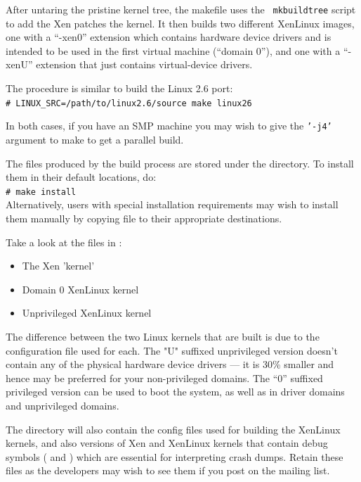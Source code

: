 \documentclass[11pt,twoside,final,openright]{xenstyle}
\begin{document}
After untaring the pristine kernel tree, the makefile uses the {\tt
mkbuildtree} script to add the Xen patches the kernel. It then builds
two different XenLinux images, one with a ``-xen0'' extension which
contains hardware device drivers and is intended to be used in the
first virtual machine (``domain 0''), and one with a ``-xenU''
extension that just contains virtual-device drivers.

The procedure is similar to build the Linux 2.6 port: \\
\verb!# LINUX_SRC=/path/to/linux2.6/source make linux26!

In both cases, if you have an SMP machine you may wish to give the
{\tt '-j4'} argument to make to get a parallel build.

The files produced by the build process are stored under the
 directory.  To install them in their default
locations, do: \\
\verb_# make install_\\

Alternatively, users with special installation requirements may wish
to install them manually by copying file to their appropriate
destinations.

Take a look at the files in :
\begin{itemize}
\item {} The Xen 'kernel'
\item {}  Domain 0 XenLinux kernel
\item {}  Unprivileged XenLinux kernel
\end{itemize}

The difference between the two Linux kernels that are built is due to
the configuration file used for each. The "U" suffixed unprivileged
version doesn't contain any of the physical hardware device drivers
--- it is 30\% smaller and hence may be preferred for your
non-privileged domains.  The ``0'' suffixed privileged version can be
used to boot the system, as well as in driver domains and unprivileged
domains.

The  directory will also contain the config files
used for building the XenLinux kernels, and also versions of Xen and
XenLinux kernels that contain debug symbols ( and
) which are essential for interpreting crash
dumps.  Retain these files as the developers may wish to see them if
you post on the mailing list.
\end{document}
